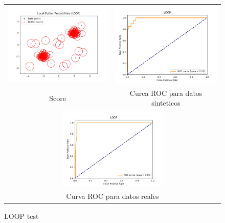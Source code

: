 \begin{figure}[H]
    \begin{tabular}{cc}
      \includegraphics[width=65mm,height=40mm]{imagenes/loop-sintetico.png} &   \includegraphics[width=65mm,height=40mm]{imagenes/loop-sintetic-roc.png} \\
    Score & Curca ROC para datos sinteticos \\[6pt]
    \multicolumn{2}{c}{\includegraphics[width=65mm,height=39mm]{imagenes/loop-test.png} }\\
    \multicolumn{2}{c}{Curva ROC para datos reales}
    \end{tabular}
    \caption{\label{fig:looptest} LOOP test}
\end{figure}

